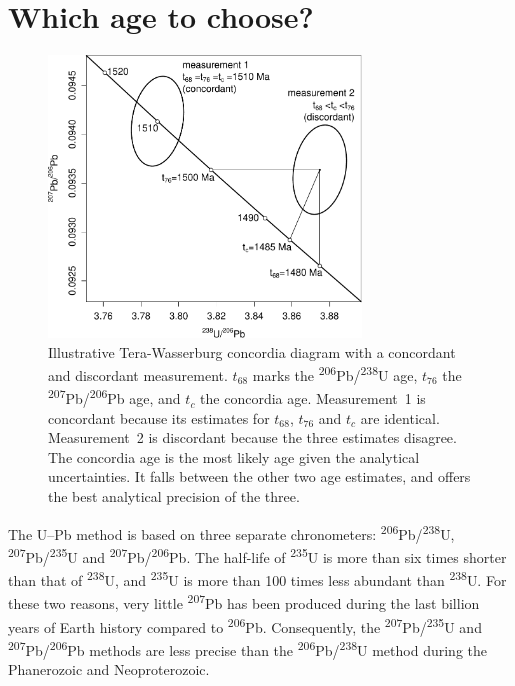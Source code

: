 \documentclass[gchron, manuscript]{copernicus}
\begin{document}
\section{Which age to choose?}\label{sec:whichage}

\begin{figure}[t]
  \includegraphics[width=8.3cm]{TW1500.pdf}
  \caption{Illustrative Tera-Wasserburg concordia diagram with a
      concordant and discordant measurement. $t_{68}$ marks the
      \textsuperscript{206}Pb/\textsuperscript{238}U age, $t_{76}$ the
      \textsuperscript{207}Pb/\textsuperscript{206}Pb age, and $t_{c}$
      the concordia age. Measurement~1 is concordant because its
      estimates for $t_{68}$, $t_{76}$ and $t_{c}$ are
      identical. Measurement~2 is discordant because the three
      estimates disagree. The concordia age is the most likely age
      given the analytical uncertainties. It falls between the other
      two age estimates, and offers the best analytical precision of
      the three.
  }
  \label{fig:concordia}
\end{figure}

The U--Pb method is based on three separate chronometers:
\textsuperscript{206}Pb/\textsuperscript{238}U,
\textsuperscript{207}Pb/\textsuperscript{235}U and
\textsuperscript{207}Pb/\textsuperscript{206}Pb. The half-life of
\textsuperscript{235}U is more than six times shorter than that of
\textsuperscript{238}U, and \textsuperscript{235}U is more than 100
times less abundant than \textsuperscript{238}U. For these two
reasons, very little \textsuperscript{207}Pb has been produced during
the last billion years of Earth history compared to
\textsuperscript{206}Pb. Consequently, the
\textsuperscript{207}Pb/\textsuperscript{235}U and
\textsuperscript{207}Pb/\textsuperscript{206}Pb methods are less
precise than the \textsuperscript{206}Pb/\textsuperscript{238}U method
during the Phanerozoic and Neoproterozoic.\\
\end{document}
